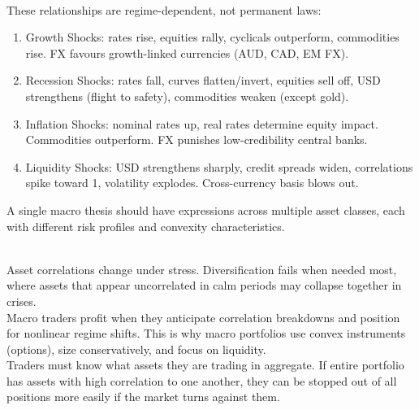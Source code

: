 \begin{remark} \\
These relationships are regime-dependent, not permanent laws:
\begin{enumerate}[label=\roman*.]
\setlength{\itemsep}{0pt}
\item Growth Shocks: rates rise, equities rally, cyclicals outperform, commodities rise. FX favours growth-linked currencies (AUD, CAD, EM FX).
\item Recession Shocks: rates fall, curves flatten/invert, equities sell off, USD strengthens (flight to safety), commodities weaken (except gold).
\item Inflation Shocks: nominal rates up, real rates determine equity impact. Commodities outperform. FX punishes low-credibility central banks.
\item Liquidity Shocks: USD strengthens sharply, credit spreads widen, correlations spike toward 1, volatility explodes. Cross-currency basis blows out.
\end{enumerate}
A single macro thesis should have expressions across multiple asset classes, each with different risk profiles and convexity characteristics.
\end{remark}

\begin{remark} \\
Asset correlations change under stress. Diversification fails when needed most, where assets that appear uncorrelated in calm periods may collapse together in crises.\\
Macro traders profit when they anticipate correlation breakdowns and position for nonlinear regime shifts. This is why macro portfolios use convex instruments (options), size conservatively, and focus on liquidity.\\
Traders must know what assets they are trading in aggregate. If entire portfolio has assets with high correlation to one another, they can be stopped out of all positions more easily if the market turns against them.
\end{remark}

